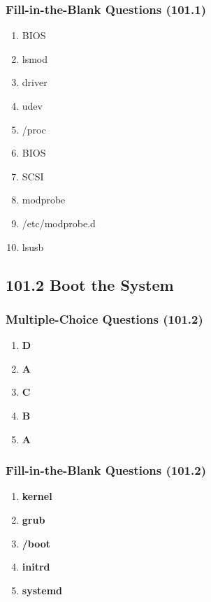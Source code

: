 \documentclass[12pt,a4paper]{report}
\begin{document}
\subsubsection*{Fill-in-the-Blank Questions (101.1)}
\begin{enumerate}[1.]
    \item BIOS
    \item lsmod
    \item driver
    \item udev
    \item /proc
    \item BIOS
    \item SCSI
    \item modprobe
    \item /etc/modprobe.d
    \item lsusb
    \end{enumerate}

\subsection*{101.2 Boot the System}
\subsubsection*{Multiple-Choice Questions (101.2)}

\begin{enumerate}[1.]
    \item \textbf{D}
    \item \textbf{A}
    \item \textbf{C}
    \item \textbf{B}
    \item \textbf{A}
\end{enumerate}

\subsubsection*{Fill-in-the-Blank Questions (101.2)}
\begin{enumerate}[1.]
    \item \textbf{kernel}
    \item \textbf{grub}
    \item \textbf{/boot}
    \item \textbf{initrd}
    \item \textbf{systemd}
\end{enumerate}
\end{document}
